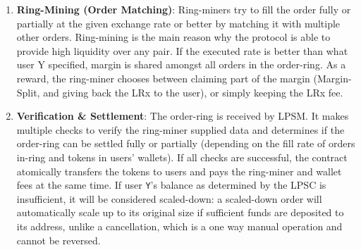 \documentclass[UTF8,nofonts]{article}
\makeatletter
\newenvironment{figurehere}
 {\def\@captype{figure}}
 {}
\makeatother
\begin{document}
\begin{multicols}{2}
\begin{enumerate}
\begin{center}
\begin{figurehere}

\caption{Loopring Exchange Process}
\label{fig:process}
\end{figurehere}
\end{center}



\item \textbf{Ring-Mining (Order Matching)}:  Ring-miners try to fill the order fully or partially at the given exchange rate or better by matching it with multiple other orders. Ring-mining is the main reason why the protocol is able to provide high liquidity over any pair. If the executed rate is better than what user Y specified, margin is shared amongst all orders in the order-ring. As a reward, the ring-miner chooses between claiming part of the margin (Margin-Split, and giving back the LRx to the user), or simply keeping the LRx fee.

\item \textbf{Verification \& Settlement}: The order-ring is received by LPSM. It makes multiple checks to verify the ring-miner supplied data and determines if the order-ring can be settled fully or partially (depending on the fill rate of orders in-ring and tokens in users' wallets). If all checks are successful, the contract atomically transfers the tokens to users and pays the ring-miner and wallet fees at the same time. If user \verb|Y|'s balance as determined by the LPSC is insufficient, it will be considered scaled-down: a scaled-down order will automatically scale up to its original size if sufficient funds are deposited to its address, unlike a cancellation, which is a one way manual operation and cannot be reversed.



\end{enumerate}
\end{multicols}
\end{document}
